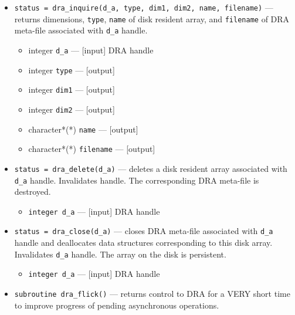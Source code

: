 \begin{itemize}
\item {\tt status = dra\_inquire(d\_a, type, dim1, dim2, name, filename)} --- 
	      returns dimensions, {\tt type}, {\tt name} of disk resident array,
	      and {\tt filename} of DRA meta-file associated with {\tt d\_a}
	      handle.

\begin{itemize}
\item              integer {\tt d\_a} ---                        [input]   DRA handle
\item              integer {\tt type} ---                       [output]
\item              integer {\tt dim1} ---                       [output]
\item              integer {\tt dim2} ---                       [output]
\item              character*(*) {\tt name} ---                 [output]
\item              character*(*) {\tt filename} ---             [output]
\end{itemize}

\item {\tt status = dra\_delete(d\_a)} ---
                deletes a disk resident array associated with {\tt d\_a} handle.
                Invalidates handle.
                The corresponding DRA meta-file is destroyed.

\begin{itemize}
\item              {\tt integer d\_a} ---  [input]   DRA handle
\end{itemize}


\item {\tt status = dra\_close(d\_a)} ---
	      closes DRA meta-file associated with {\tt d\_a} handle and
	      deallocates data structures corresponding to this disk
	      array.  Invalidates {\tt d\_a} handle. The array on the disk is
	      persistent.

\begin{itemize}
\item              {\tt integer d\_a} ---  [input]   DRA handle
\end{itemize}


\item {\tt subroutine dra\_flick()} --- 
             returns control to DRA for a VERY short time to improve 
             progress of pending asynchronous operations.
\end{itemize}

